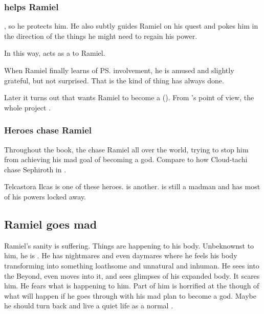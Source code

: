 \subsubsection{\Azraid{} helps Ramiel}
\Azraid{} , so he protects him. 
He also subtly guides Ramiel on his quest and pokes him in the direction of the things he might need to regain his power. 

In this way, \Azraid{} acts as a  to Ramiel. 

When Ramiel finally learns of \ps{\Azraid} involvement, he is amused and slightly grateful, but not surprised. 
That is the kind of thing \Azraid{} has always done. 

Later it turns out that \Azraid wants Ramiel to become a \neoresphan ().
From \Azraid's point of view, the whole \malach project . 





\subsubsection{Heroes chase Ramiel}
Throughout the book, the  chase Ramiel all over the world, trying to stop him from achieving his mad goal of becoming a god. 
Compare to how Cloud-tachi chase Sephiroth in \cite{VideoGame:FinalFantasyVII}. 

Telcastora Ilcas is one of these heroes.
\Sithiyacaan is another. 
\Sithiyacaan is still a madman and has most of his powers locked away. 









\subsection{Ramiel goes mad}
Ramiel's sanity is suffering.
Things are happening to his body.
Unbeknownst to him, he is . 
He has nightmares and even daymares where he feels his body transforming into something loathsome and unnatural and inhuman. 
He sees into the Beyond, even moves into it, and sees glimpses of his expanded \neoresphan body.
It scares him. 
He fears what is happening to him. 
Part of him is horrified at the though of what will happen if he goes through with his mad plan to become a god. 
Maybe he should turn back and live a quiet life as a normal \human. 

